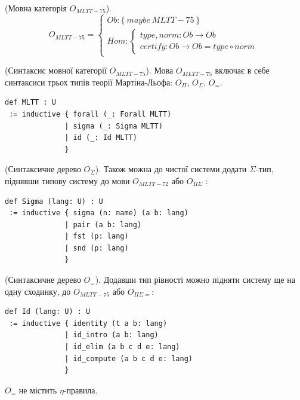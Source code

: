 \begin{definition} (Мовна категорія $O_{MLTT-75}$).
\begin{equation}
O_{MLTT-75} =
\begin{cases}
Ob: \{\ maybe\ MLTT-75\ \} \\
Hom: \begin{cases}
type,norm: Ob \rightarrow Ob \\
certify: Ob \rightarrow Ob = type \circ norm
\end{cases}
\end{cases}
\end{equation}
\end{definition}

\begin{definition} (Синтаксис мовної категорії $O_{MLTT-75}$).
Мова $O_{MLTT-75}$ включає в себе синтаксиси трьох типів
теорії Мартіна-Льофа: $O_\Pi$, $O_\Sigma$, $O_=$.
\begin{lstlisting}
def MLTT : U
 := inductive { forall (_: Forall MLTT)
              | sigma (_: Sigma MLTT)
              | id (_: Id MLTT)
              }
\end{lstlisting}
\end{definition}

\begin{definition} (Синтаксичне дерево $O_\Sigma$).
Також можна до чистої системи додати $\Sigma$-тип,
піднявши типову систему до мови $O_{MLTT-72}$ або $O_{\Pi\Sigma}$ :
\begin{lstlisting}[mathescape=true]
def Sigma (lang: U) : U
 := inductive { sigma (n: name) (a b: lang)
              | pair (a b: lang)
              | fst (p: lang)
              | snd (p: lang)
              }
\end{lstlisting}
\end{definition}

\begin{definition} (Синтаксичне дерево $O_=$).
Додавши тип рівності можно підняти систему ще на одну сходинку,
до $O_{MLTT-75}$ або $O_{\Pi\Sigma=}$:
\begin{lstlisting}[mathescape=true]
def Id (lang: U) : U
 := inductive { identity (t a b: lang)
              | id_intro (a b: lang)
              | id_elim (a b c d e: lang)
              | id_compute (a b c d e: lang)
              }
\end{lstlisting}
\end{definition}

$O_=$ не містить $\eta$-правила.

\newpage
